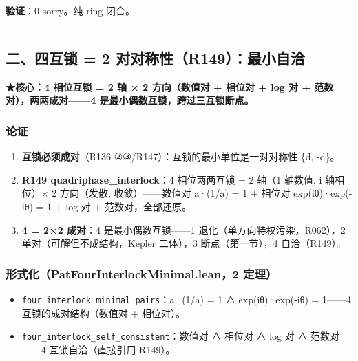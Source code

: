 \documentclass[
]{article}
\providecommand{\tightlist}{%
 \setlength{\itemsep}{0pt}\setlength{\parskip}{0pt}}
\begin{document}
\textbf{验证}：0 sorry。纯 ring 闭合。

\begin{center}\rule{0.5\linewidth}{0.5pt}\end{center}

\subsection{二、四互锁 = 2
对对称性（R149）：最小自洽}\label{ux4e8cux56dbux4e92ux9501-2-ux5bf9ux5bf9ux79f0ux6027r149ux6700ux5c0fux81eaux6d3d}

\textbf{★核心：4 相位互锁 = 2 轴 × 2 方向（数值对 + 相位对 + log 对 +
范数对），两两成对------4 是最小偶数互锁，跨过三互锁断点。}

\subsubsection{论证}\label{ux8bbaux8bc1-1}

\begin{enumerate}
\def\labelenumi{\arabic{enumi}.}
\tightlist
\item
 \textbf{互锁必须成对}（R136 ②③/R147）：互锁的最小单位是一对对称性 \{d,
 -d\}。
\item
 \textbf{R149 quadriphase\_interlock}：4 相位两两互锁 = 2 轴（1 轴数值,
 i 轴相位）× 2 方向（发散, 收敛）------数值对 a·(1/a) = 1 + 相位对
 exp(iθ)·exp(-iθ) = 1 + log 对 + 范数对，全部还原。
\item
 \textbf{4 = 2×2 成对}：4 是最小偶数互锁------1
 退化（单方向特权污染，R062），2 单对（可解但不成结构，Kepler 二体），3
 断点（第一节），4 自洽（R149）。
\end{enumerate}

\subsubsection{形式化（PatFourInterlockMinimal.lean，2
定理）}\label{ux5f62ux5f0fux5316patfourinterlockminimal.lean2-ux5b9aux7406-1}

\begin{itemize}
\tightlist
\item
 \texttt{four\_interlock\_minimal\_pairs}：a·(1/a) = 1 ∧
 exp(iθ)·exp(-iθ) = 1------4 互锁的成对结构（数值对 + 相位对）。
\item
 \texttt{four\_interlock\_self\_consistent}：数值对 ∧ 相位对 ∧ log 对 ∧
 范数对------4 互锁自洽（直接引用 R149）。
\end{itemize}
\end{document}
